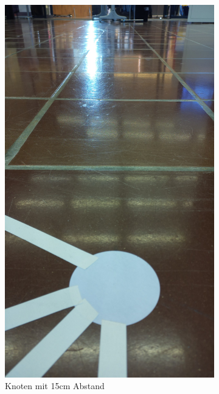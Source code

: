 \begin{figure}[H]
\begin{subfigure}{0.45\textwidth}
\centering
\includegraphics[width=0.95\linewidth]{assets/informatik-prototyp/opencv/angle_detection/image_taken_by_pi_camer_before_node.jpg} 
\caption{Knoten mit 15cm Abstand}
\label{fig:node-15cm-before}
\end{subfigure}
\begin{subfigure}{0.45\textwidth}

\end{subfigure}
\end{figure}
